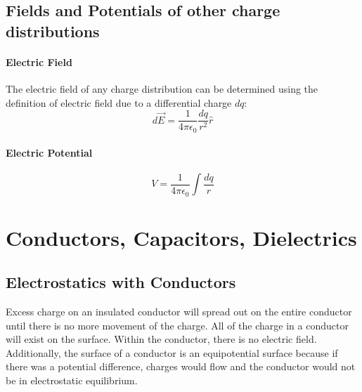 \documentclass{article}
\begin{document}
        \subsection{Fields and Potentials of other charge distributions}
            \paragraph{Electric Field}
            The electric field of any charge distribution can be determined using the definition of electric field due to a differential charge $dq$:
            \begin{equation}
                d\vec{E} = \frac{1}{4 \pi \epsilon_0} \frac{dq}{r^2} \hat{r}
            \end{equation}

            \paragraph{Electric Potential}
            \begin{equation}
                V = \frac{1}{4 \pi \epsilon_0} \int \frac{dq}{r}
            \end{equation}

    \section{Conductors, Capacitors, Dielectrics}

        \subsection{Electrostatics with Conductors}
            Excess charge on an insulated conductor will spread out on the entire conductor until there is no more movement of the charge. All of the charge in a conductor will exist on the surface. Within the conductor, there is no electric field. Additionally, the surface of a conductor is an equipotential surface because if there was a potential difference, charges would flow and the conductor would not be in electrostatic equilibrium.
\end{document}

